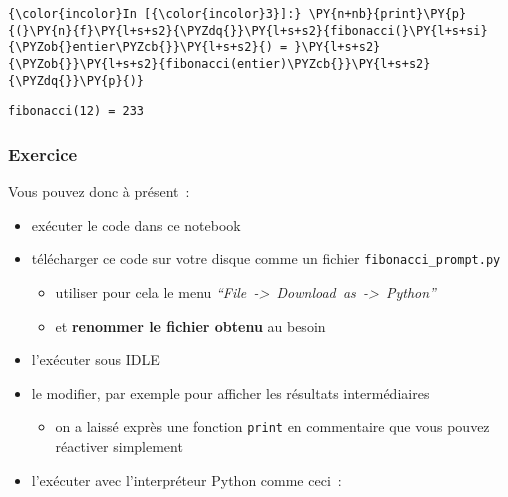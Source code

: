     \begin{Verbatim}[commandchars=\\\{\},frame=single,framerule=0.3mm,rulecolor=\color{cellframecolor}]
{\color{incolor}In [{\color{incolor}3}]:} \PY{n+nb}{print}\PY{p}{(}\PY{n}{f}\PY{l+s+s2}{\PYZdq{}}\PY{l+s+s2}{fibonacci(}\PY{l+s+si}{\PYZob{}entier\PYZcb{}}\PY{l+s+s2}{) = }\PY{l+s+s2}{\PYZob{}}\PY{l+s+s2}{fibonacci(entier)\PYZcb{}}\PY{l+s+s2}{\PYZdq{}}\PY{p}{)}
\end{Verbatim}


    \begin{Verbatim}[commandchars=\\\{\},frame=single,framerule=0.3mm,rulecolor=\color{cellframecolor}]
fibonacci(12) = 233
\end{Verbatim}

    \hypertarget{exercice}{%
\subsubsection{Exercice}\label{exercice}}

    Vous pouvez donc à présent~:

\begin{itemize}
\tightlist
\item
  exécuter le code dans ce notebook
\item
  télécharger ce code sur votre disque comme un fichier
  \texttt{fibonacci\_prompt.py}

  \begin{itemize}
  \tightlist
  \item
    utiliser pour cela le menu
    \emph{``File~-\textgreater{}~Download~as~-\textgreater{}~Python''}
  \item
    et \textbf{renommer le fichier obtenu} au besoin
  \end{itemize}
\item
  l'exécuter sous IDLE
\item
  le modifier, par exemple pour afficher les résultats intermédiaires

  \begin{itemize}
  \tightlist
  \item
    on a laissé exprès une fonction \texttt{print} en commentaire que
    vous pouvez réactiver simplement
  \end{itemize}
\item
  l'exécuter avec l'interpréteur Python comme ceci~:
\end{itemize}

\begin{Shaded}
\begin{Highlighting}[frame=lines,framerule=0.6mm,rulecolor=\color{asisframecolor}]
\NormalTok{$ }
\end{Highlighting}
\end{Shaded}

